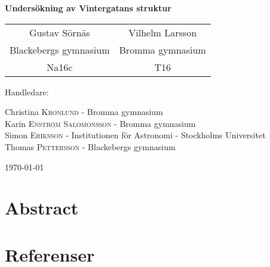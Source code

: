 \documentclass[a4paper,12pt]{report}
\begin{document}

\begin{titlepage}
	\centering
	{\huge\bfseries Undersökning av Vintergatans struktur \par}
	\vfill
	{\Large\begin{tabular}{c c}
	     Gustav Sörnäs & Vilhelm Larsson  \\
	     Blackebergs gymnasium & Bromma gymnasium \\
	     Na16c & T16
	\end{tabular}\par}
	\vfill
	Handledare:\par
	Christina \textsc{Kronlund} - Bromma gymnasium\\
	Karin \textsc{Enström Salomonsson} - Bromma gymnasium\\
	Simon \textsc{Eriksson} - Institutionen för Astronomi - Stockholms Universitet\\
	Thomas \textsc{Pettersson} - Blackebergs gymnasium

	\vfill

	{\large \today\par}
\end{titlepage}

\newpage
{}

\chapter*{Abstract}


\newpage

\tableofcontents

\listoffigures

\newpage
{}







\chapter{Referenser}
\printbibliography[heading=none]
\end{document}
